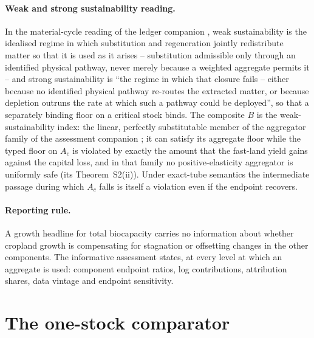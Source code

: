 \paragraph{Weak and strong sustainability reading.} In the material-cycle reading of the ledger companion \citep{Abaee2026c}, weak sustainability is the idealised regime in which substitution and regeneration jointly redistribute matter so that it is used as it arises -- substitution admissible only through an identified physical pathway, never merely because a weighted aggregate permits it -- and strong sustainability is ``the regime in which that closure fails -- either because no identified physical pathway re-routes the extracted matter, or because depletion outruns the rate at which such a pathway could be deployed'', so that a separately binding floor on a critical stock binds. The composite $B$ is the weak-sustainability index: the linear, perfectly substitutable member of the aggregator family of the assessment companion \citep[Lemma~A of][]{Abaee2026b}; it can satisfy its aggregate floor while the typed floor on $A_c$ is violated by exactly the amount that the fast-land yield gains against the capital loss, and in that family no positive-elasticity aggregator is uniformly safe (its Theorem~S2(ii)). Under exact-tube semantics the intermediate passage during which $A_c$ falls is itself a violation even if the endpoint recovers.

\paragraph{Reporting rule.} A growth headline for total biocapacity carries no information about whether cropland growth is compensating for stagnation or offsetting changes in the other components. The informative assessment states, at every level at which an aggregate is used: component endpoint ratios, log contributions, attribution shares, data vintage and endpoint sensitivity.

\section{The one-stock comparator}\label{si:onestock}

